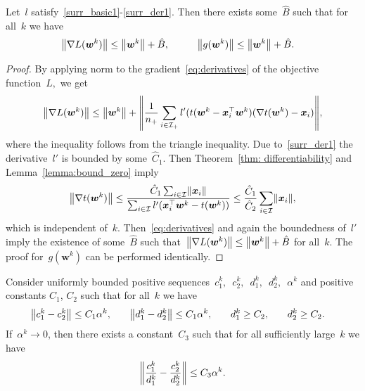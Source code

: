 \begin{lemma}\label{lemma:bound_g}
  Let~$l$ satisfy~\ref{surr_basic1}-\ref{surr_der1}. Then there exists some~$\hat{B}$ such that for all~$k$ we have
  \begin{equation*}
    \begin{aligned}
      \norm{\nabla L(\bm{w}^k)} & \leq \norm{\bm{w}^k} +  \hat{B}, \quad & \quad
      \norm{g(\bm{w}^k)} & \leq \norm{\bm{w}^k} + \hat{B}.
    \end{aligned}
  \end{equation*}
\end{lemma}
\begin{proof}
  By applying norm to the gradient~\eqref{eq:derivatives} of the objective function~$L,$ we get 
  \begin{equation*}
    \norm{\nabla L(\bm{w}^k)}
      \leq \norm{\bm{w}^k} + \norm{\frac{1}{\npos} \sum_{i \in \Ipos} l'(t(\bm{w}^k - \bm{x}_i^{\top} \bm{w}^k)(\nabla t(\bm{w}^k) - \bm{x}_i)},
  \end{equation*}
  where the inequality follows from the triangle inequality. Due to~\ref{surr_der1} the derivative~$l'$ is bounded by some~$\hat{C}_1$. Then Theorem~\ref{thm: differentiability} and Lemma~\ref{lemma:bound_zero} imply
  \begin{equation*}
    \norm{\nabla t(\bm{w}^k)}
      \leq \frac{\hat{C}_1 \sum_{i \in \I} \norm{\bm{x}_i}}{\sum_{i \in \I} l'(\bm{x}_i^\top \bm{w}^k - t(\bm{w}^k))}
      \leq \frac{\hat{C}_1}{\hat{C}_2} \sum_{i\in \I} \norm{\bm{x}_i},
  \end{equation*}
  which is independent of~$k$. Then~\eqref{eq:derivatives} and again the boundedness of~$l'$ imply the existence of some~$\hat{B}$ such that~$\norm{\nabla L(\bm{w}^k)} \leq \norm{\bm{w}^k} + \hat{B}$ for all~$k$. The proof for~$g(\bm{w}^k)$ can be performed identically.
\end{proof}

\begin{lemma}\label{lemma:ratio}
  Consider uniformly bounded positive sequences~$c_1^k,$~$c_2^k,$~$d_1^k,$~$d_2^k,$~$\alpha^k$ and positive constants $C_1$, $C_2$ such that for all~$k$ we have
  \begin{equation*}
    \begin{aligned}
      \norm{c_1^k-c_2^k} & \leq C_1\alpha^k, \quad &
      \norm{d_1^k-d_2^k} & \leq C_1\alpha^k, \quad &
      d_1^k & \geq C_2, \quad &
      d_2^k & \geq C_2.
    \end{aligned}
  \end{equation*}
  If~$\alpha^k \to 0$, then there exists a constant~$C_3$ such that for all sufficiently large~$k$ we have
  \begin{equation*}
    \norm{\frac{c_1^k}{d_1^k} - \frac{c_2^k}{d_2^k}} \leq C_3\alpha^k.
  \end{equation*}
\end{lemma}

